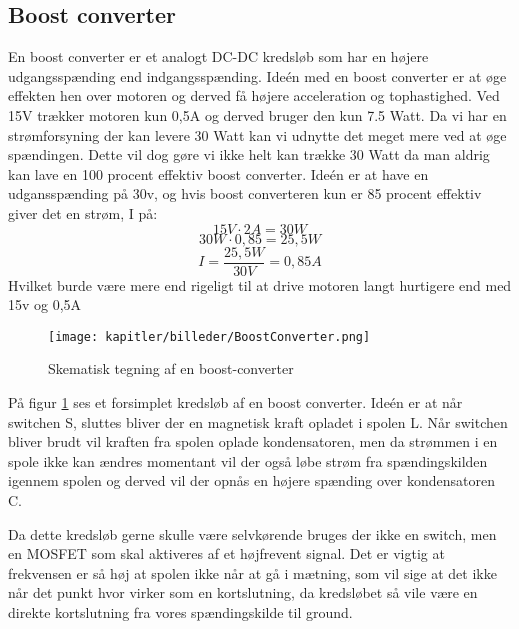 \newpage
\subsection{Boost converter}
En boost converter er et analogt DC-DC kredsløb som har en højere udgangsspænding end indgangsspænding.
Ideén med en boost converter er at øge effekten hen over motoren og derved få højere acceleration og tophastighed. Ved 15V trækker motoren kun 0,5A og derved bruger den kun 7.5 Watt. Da vi har en strømforsyning der kan levere 30 Watt kan vi udnytte det meget mere ved at øge spændingen. Dette vil dog gøre vi ikke helt kan trække 30 Watt da man aldrig kan lave en 100 procent effektiv boost converter.  Ideén er at have en udgansspænding på 30v, og hvis boost converteren kun er 85 procent effektiv giver det en strøm, I på:
\begin{equation}
15V \cdot 2A = 30 W
\end{equation}
\begin{equation}
30 W \cdot 0,85 = 25,5 W
\end{equation}
\begin{equation}
I = \frac{25,5 W}{30 V} = 0,85A
\end{equation}
Hvilket burde være mere end rigeligt til at drive motoren langt hurtigere end med 15v og 0,5A

\begin{figure}[ht]
    \centering
    \texttt{[image: kapitler/billeder/BoostConverter.png]}
    \caption{Skematisk tegning af en boost-converter}
    \label{fig:boostconvert}
\end{figure}

På figur \ref{fig:boostconvert} ses et forsimplet kredsløb af en boost converter. Ideén er at når switchen S, sluttes bliver der en magnetisk kraft opladet i spolen L. Når switchen bliver brudt vil kraften fra spolen oplade kondensatoren, men da strømmen i en spole ikke kan ændres momentant vil der også løbe strøm fra spændingskilden igennem spolen og derved vil der opnås en højere spænding over kondensatoren C.

Da dette kredsløb gerne skulle være selvkørende bruges der ikke en switch, men en MOSFET som skal aktiveres af et højfrevent signal. Det er vigtig at frekvensen er så høj at spolen ikke når at gå i mætning, som vil sige at det ikke når det punkt hvor virker som en kortslutning, da kredsløbet så vile være en direkte kortslutning fra vores spændingskilde til ground.

